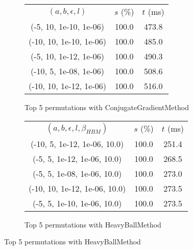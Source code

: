 \begin{figure}[H]
{\begin{subfigure}[ht]{.6\textwidth}
\begin{tabular}{|c|c|c|}
\hline
\rowcolor{gray!25}
\multicolumn{3}{|c|}{ConjugateGradientMethod} \\
\hline
\rowcolor{gray!25}
$(a,b,\epsilon,l)$ & $s$ (\%) & $t$ (ms) \\
\hline
(-5, 10, 1e-10, 1e-06) & 100.0 & 473.8 \\
(-10, 10, 1e-10, 1e-06) & 100.0 & 485.0 \\
(-5, 10, 1e-12, 1e-06) & 100.0 & 490.3 \\
(-10, 5, 1e-08, 1e-06) & 100.0 & 508.6 \\
(-10, 10, 1e-12, 1e-06) & 100.0 & 516.0 \\
\hline
\end{tabular}
\caption{Top 5 permutations with ConjugateGradientMethod}
\label{subfig:param_comp_MatrixSquareSum_ConjugateGradientMethod_FibonacciSearch}
\end{subfigure}
\hfill
\begin{subfigure}[ht]{.6\textwidth}
\centering
{}
\begin{tabular}{|c|c|c|}
\hline
\rowcolor{gray!25}
\multicolumn{3}{|c|}{HeavyBallMethod} \\
\hline
\rowcolor{gray!25}
$(a,b,\epsilon,l,\beta_{HBM})$ & $s$ (\%) & $t$ (ms) \\
\hline
(-10, 5, 1e-12, 1e-06, 10.0) & 100.0 & 251.4 \\
(-5, 5, 1e-12, 1e-06, 10.0) & 100.0 & 268.5 \\
(-5, 5, 1e-08, 1e-06, 10.0) & 100.0 & 273.0 \\
(-10, 10, 1e-12, 1e-06, 10.0) & 100.0 & 273.5 \\
(-5, 5, 1e-10, 1e-06, 10.0) & 100.0 & 273.5 \\
\hline
\end{tabular}
\caption{Top 5 permutations with HeavyBallMethod}
\label{subfig:param_comp_MatrixSquareSum_HeavyBallMethod_FibonacciSearch}
\end{subfigure}
}
\end{figure}

